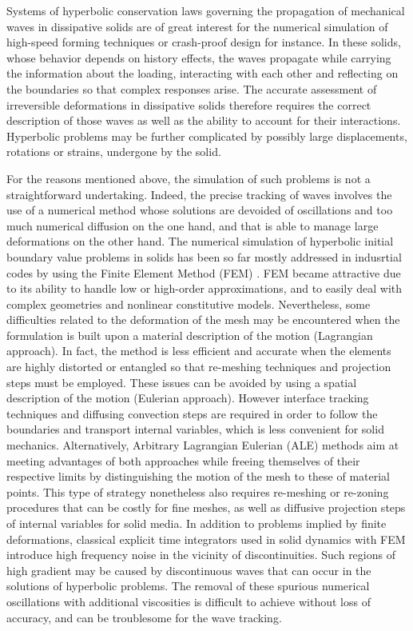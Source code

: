 Systems of hyperbolic conservation laws governing the propagation of mechanical waves in dissipative solids are of great interest for the numerical simulation of high-speed forming techniques or crash-proof design for instance.
In these solids, whose behavior depends on history effects, the waves propagate while carrying the information about the loading, interacting with each other and reflecting on the boundaries so that complex responses arise.
The accurate assessment of irreversible deformations in dissipative solids therefore requires the correct description of those waves as well as the ability to account for their interactions.
Hyperbolic problems may be further complicated by possibly large displacements, rotations or strains, undergone by the solid.

For the reasons mentioned above, the simulation of such problems is not a straightforward undertaking.
Indeed, the precise tracking of waves involves the use of a numerical method whose solutions are devoided of oscillations and too much numerical diffusion on the one hand, and that is able to manage large deformations on the other hand.
The numerical simulation of hyperbolic initial boundary value problems in solids has been so far mostly addressed in indusrtial codes by using the Finite Element Method (FEM) \cite{Belytschko}.
FEM became attractive due to its ability to handle low or high-order approximations, and to easily deal with complex geometries and nonlinear constitutive models. %
Nevertheless, some difficulties related to the deformation of the mesh may be encountered when the formulation is built upon a material description of the motion (Lagrangian approach). 
In fact, the method is less efficient and accurate when the elements are highly distorted or entangled so that re-meshing techniques and projection steps must be employed.
These issues can be avoided by using a spatial description of the motion (Eulerian approach).
However interface tracking techniques and diffusing convection steps are required in order to follow the boundaries and transport internal variables, which is less convenient for solid mechanics.
Alternatively, Arbitrary Lagrangian Eulerian (ALE) methods aim at meeting advantages of both approaches while freeing themselves of their respective limits by distinguishing the motion of the mesh to these of material points.
This type of strategy nonetheless also requires re-meshing or re-zoning procedures that can be costly for fine meshes, as well as diffusive projection steps of internal variables for solid media.
In addition to problems implied by finite deformations, classical explicit time integrators used in solid dynamics with FEM introduce high frequency noise in the vicinity of discontinuities.
Such regions of high gradient may be caused by discontinuous waves that can occur in the solutions of hyperbolic problems.
The removal of these spurious numerical oscillations with additional viscosities is difficult to achieve without loss of accuracy, and can be troublesome for the wave tracking.

